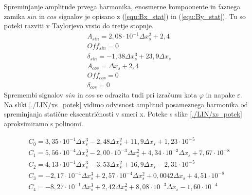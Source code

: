 Spreminjanje amplitude prvega harmonika, enosmerne kompoonente in faznega zamika $sin$ in $cos$ signalov je opisano z (\ref{equ:Bx_stat}) in (\ref{equ:By_stat}). Tu so poteki razviti v Taylorjevo vrsto do tretje stopnje.
\begin{eqnarray}
\label{analog_lin_xs}
&A_{sin} = 2,08 \cdot 10^{-1} \Delta x_s^2+2,4\\
&Off_{sin} = 0 \\
&\delta_{sin} =-1,38 \Delta x_s^3+ 23,9 \Delta x_s  \\
&A_{cos} = \Delta x_s+2,4\\
&Off_{cos} = 0 \\
&\delta_{cos} = 0
\end{eqnarray}
\newpage
Spremembi signalov $sin$ in $cos$ se odrazita tudi pri izračunu kota $\varphi$ in napake $\varepsilon$.
Na sliki \ref{./LIN/xs_potek} vidimo odvisnost amplitud posameznega harmonika od spreminjanja statične ekscentričnosti v smeri x. Poteke s slike \ref{./LIN/xs_potek} aproksimiramo s polinomi.

\begin{eqnarray}
\label{nap_lin_xs}
&C_0 =3,35\cdot 10^{-1}\Delta x_s^{3}-2,48\Delta x_s^{2}+11,9\Delta x_s+1,23\cdot 10^{-5} \\
&C_1 =5,56\cdot 10^{-4}\Delta x_s^{3}-2,00\cdot 10^{-3}\Delta x_s^{2}+4,34\cdot 10^{-3}\Delta x_s+7,67\cdot 10^{-8} \\
&C_2 =4,13\cdot 10^{-1}\Delta x_s^{3}-3,53\Delta x_s^{2}+16,9\Delta x_s-2,31\cdot 10^{-5} \\
&C_3 =-2,17\cdot 10^{-4}\Delta x_s^{3}+2,57\cdot 10^{-4}\Delta x_s^{2}+0,0042\Delta x_s+4,51\cdot 10^{-8} \\
&C_4 =-8,27\cdot 10^{-1}\Delta x_s^{3}+2,42\Delta x_s^{2}+8,08\cdot 10^{-3}\Delta x_s-1,60\cdot 10^{-4}
\end{eqnarray}

